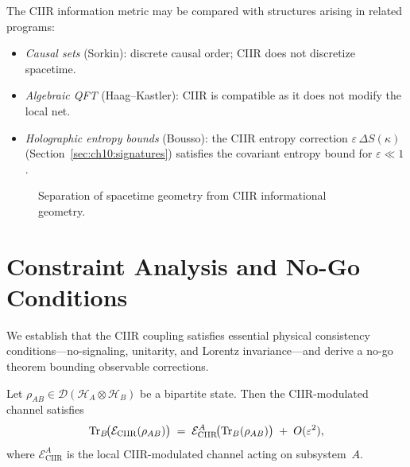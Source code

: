 \begin{remark}
\label{rem:10.5}
The CIIR information metric may be compared with structures arising in
related programs:
\begin{itemize}
  \item \emph{Causal sets} (Sorkin): discrete causal order; CIIR does
        not discretize spacetime.
  \item \emph{Algebraic QFT} (Haag--Kastler): CIIR is compatible as it
        does not modify the local net.
  \item \emph{Holographic entropy bounds} (Bousso): the CIIR entropy
        correction $\varepsilon\,\Delta S(\kappa)$
        (Section~\ref{sec:ch10:signatures}) satisfies the covariant
        entropy bound for $\varepsilon\ll 1$.
\end{itemize}
\end{remark}

\begin{figure}[t]
\centering
{}
\caption{Separation of spacetime geometry from CIIR informational
  geometry.}
\label{fig:c10:spacetime}
\end{figure}

\section{Constraint Analysis and No-Go Conditions}
\label{sec:ch10:nogo}

We establish that the CIIR coupling satisfies essential physical
consistency conditions---no-signaling, unitarity, and Lorentz
invariance---and derive a no-go theorem bounding observable
corrections.

\begin{theorem}
\label{thm:10.8}
Let $\rho_{AB}\in\mathcal{D}(\mathcal{H}_A\otimes\mathcal{H}_B)$ be
a bipartite state.  Then the CIIR-modulated channel satisfies
\begin{equation}
\label{eq:10.nosignal}
  \mathrm{Tr}_B\!\bigl(\mathcal{E}_{\mathrm{CIIR}}(\rho_{AB})\bigr)
  \;=\;
  \mathcal{E}_{\mathrm{CIIR}}^{A}\!\bigl(\mathrm{Tr}_B(\rho_{AB})\bigr)
  \;+\;
  O(\varepsilon^2),
\end{equation}
where $\mathcal{E}_{\mathrm{CIIR}}^A$ is the local CIIR-modulated
channel acting on subsystem~$A$.
\end{theorem}

